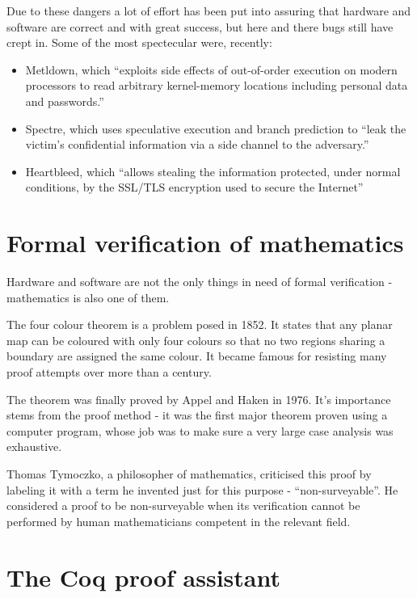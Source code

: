 \documentclass[declaration,inz,english,shortabstract]{iithesis}
\begin{document}
Due to these dangers a lot of effort has been put into assuring that hardware and software are correct and with great success, but here and there bugs still have crept in. Some of the most spectecular were, recently:

\begin{itemize}
    \item Metldown, which ``exploits side effects of out-of-order execution on modern processors to read arbitrary kernel-memory locations including  personal  data  and  passwords.'' \cite{Meltdown}
    \item Spectre, which uses speculative execution and branch prediction to ``leak the victim's confidential information via a side  channel to  the  adversary.'' \cite{Spectre}
    \item Heartbleed, which ``allows stealing the information protected, under normal conditions, by the SSL/TLS encryption used to secure the Internet'' \cite{Heartbleed}
\end{itemize}

\section{Formal verification of mathematics}

Hardware and software are not the only things in need of formal verification - mathematics is also one of them.

The four colour theorem is a problem posed in 1852. It states that any planar map can be coloured with only four colours so that no two regions sharing a boundary are assigned the same colour. It became famous for resisting many proof attempts over more than a century.

The theorem was finally proved by Appel and Haken in 1976. It's importance stems from the proof method - it was the first major theorem proven using a computer program, whose job was to make sure a very large case analysis was exhaustive.

Thomas Tymoczko, a philosopher of mathematics, criticised this proof by labeling it with a term he invented just for this purpose - ``non-surveyable''. He considered a proof to be non-surveyable when its verification cannot be performed by human mathematicians competent in the relevant field.



\section{The Coq proof assistant}
\end{document}
